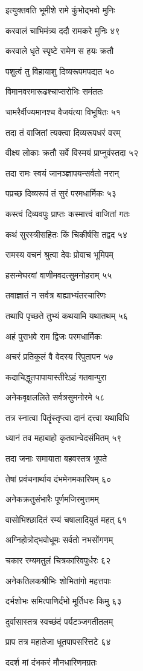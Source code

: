 इत्युक्तवति भूमीशे रामे कुंभोद्भवो मुनिः

करवालं चाभिमंत्र्य ददौ रामकरे मुनिः ४९

करवाले धृते स्पृष्टे रामेण स हयः क्रतौ

पशुत्वं तु विहायाशु दिव्यरूपमपद्यत ५०

विमानवरमारूढश्चाप्सरोभिः समंततः

चामरैर्वीज्यमानश्च वैजयंत्या विभूषितः ५१

तदा तं वाजितां त्यक्त्वा दिव्यरूपधरं वरम्

वीक्ष्य लोकाः क्रतौ सर्वे विस्मयं प्राप्नुवंस्तदा ५२

तदा रामः स्वयं जानञ्ज्ञापयन्सर्वतो नरान्

पप्रच्छ दिव्यरूपं तं सुरं परमधार्मिकः ५३

कस्त्वं दिव्यवपुः प्राप्तः कस्मात्त्वं वाजितां गतः

कथं सुरस्त्रीसहितः किं चिकीर्षसि तद्वद ५४

रामस्य वचनं श्रुत्वा देवः प्रोवाच भूमिपम्

हसन्मेघरवां वाणीमवदत्सुमनोहराम् ५५

तवाज्ञातं न सर्वत्र बाह्याभ्यंतरचारिणः

तथापि पृच्छते तुभ्यं कथयामि यथातथम् ५६

अहं पुराभवे राम द्विजः परमधार्मिकः

अचरं प्रतिकूलं वै वेदस्य रिपुतापन ५७

कदाचिद्धुतपापायास्तीरेऽहं गतवान्पुरा

अनेकवृक्षललिते सर्वत्रसुमनोरमे ५८

तत्र स्नात्वा पितॄंस्तृप्त्वा दानं दत्त्वा यथाविधि

ध्यानं तव महाबाहो कृतवान्वेदसंमितम् ५९

तदा जनाः समायाता बहवस्तत्र भूपते

तेषां प्रवंचनार्थाय दंभमेनमकारिषम् ६०

अनेकक्रतुसंभारैः पूर्णमजिरमुत्तमम्

वासोभिश्छादितं रम्यं चषालादियुतं महत् ६१

अग्निहोत्रोद्भवोधूमः सर्वतो नभसोंगणम्

चकार रम्यमतुलं चित्रकारिवपुर्धरः ६२

अनेकतिलकश्रीभिः शोभितांगो महत्तपाः

दर्भशोभः समित्पाणिर्दंभो मूर्तिधरः किमु ६३

दुर्वासास्तत्र स्वच्छंदं पर्यटञ्जगतीतलम्

प्राप तत्र महातेजा धूतपापसरित्तटे ६४

ददर्श मां दंभकरं मौनधारिणमग्रतः

